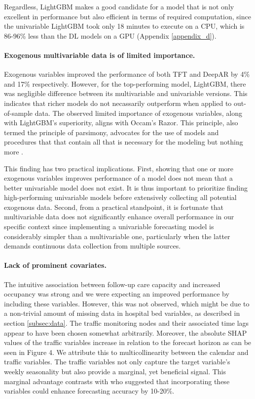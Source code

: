 Regardless, LightGBM makes a good candidate for a model that is not only excellent in performance but also efficient in terms of required computation, since the univariable LightGBM took only 18 minutes to execute on a CPU, which is 86-96\% less than the DL models on a GPU (Appendix \ref{appendix_d}).

\paragraph{Exogenous multivariable data is of limited importance.}
Exogenous variables improved the performance of both TFT and DeepAR by 4\% and 17\% respectively. However, for the top-performing model, LightGBM, there was negligible difference between its multivariable and univariable versions. This indicates that richer models do not necassarily outperform when applied to out-of-sample data. The observed limited importance of exogenous variables, along with LightGBM's superiority, aligns with Occam's Razor. This principle, also termed the principle of parsimony, advocates for the use of models and procedures that that contain all that is necessary for the modeling but nothing more \cite{hawkins2004problem}.

This finding has two practical implications. First, showing that one or more exogenous variables improves performance of a model does not mean that a better univariable model does not exist. It is thus important to prioritize finding high-performing univariable models before extensively collecting all potential exogenous data. Second, from a practical standpoint, it is fortunate that multivariable data does not significantly enhance overall performance in our specific context since implementing a univariable forecasting model is considerably simpler than a multivariable one, particularly when the latter demands continuous data collection from multiple sources.

\paragraph{Lack of prominent covariates.} The intuitive association between follow-up care capacity and increased occupancy was strong and we were expecting an improved performance by including these variables. However, this was not observed, which might be due to a non-trivial amount of missing data in hospital bed variables, as described in section \ref{subsec:data}. The traffic monitoring nodes and their associated time lags appear to have been chosen somewhat arbitrarily. Moreover, the absolute SHAP values of the traffic variables increase in relation to the forecast horizon as can be seen in Figure 4. We attribute this to multicollinearity between the calendar and traffic variables. The traffic variables not only capture the target variable’s weekly seasonality but also provide a marginal, yet beneficial signal. This marginal advantage contrasts with \citet{Rauch2019} who suggested that incorporating these variables could enhance forecasting accuracy by 10-20\%.

